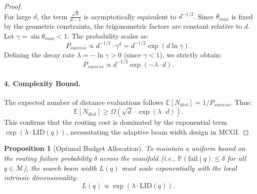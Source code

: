 \documentclass{article}
\theoremstyle{plain}
\newtheorem{proposition}[theorem]{Proposition}
\theoremstyle{definition}
\theoremstyle{remark}
\begin{document}
\begin{proof}
\begin{equation}
\end{equation}
For large $d$, the term $\frac{\sqrt{d}}{d-1}$ is asymptotically equivalent to $d^{-1/2}$. Since $\theta_{max}$ is fixed by the geometric constraints, the trigonometric factors are constant relative to $d$. Let $\gamma = \sin \theta_{max} < 1$. The probability scales as:
\begin{equation}
    P_{success} \propto d^{-1/2} \cdot \gamma^{d} = d^{-1/2} \exp(d \ln \gamma).
\end{equation}
Defining the decay rate $\lambda = -\ln \gamma > 0$ (since $\gamma < 1$), we strictly obtain:
\begin{equation}
    P_{success} \propto d^{-1/2} \exp(-\lambda \cdot d).
\end{equation}

\paragraph{4. Complexity Bound.}
The expected number of distance evaluations follows $\mathbb{E}[N_{dist}] = 1/P_{success}$. Thus:
\begin{equation}
    \mathbb{E}[N_{dist}] \ge \Omega\left( \sqrt{d} \cdot \exp(\lambda \cdot d) \right).
\end{equation}
This confirms that the routing cost is dominated by the exponential term $\exp(\lambda \cdot \text{LID}(q))$, necessitating the adaptive beam width design in MCGI.
\end{proof}

\begin{proposition}[Optimal Budget Allocation]
\label{proof:oba}
To maintain a uniform bound on the routing failure probability $\delta$ across the manifold (i.e., $\mathbb{P}(\text{fail}\;|\;q) \le \delta$ for all $q \in \mathcal{M}$), the search beam width $L(q)$ must scale exponentially with the local intrinsic dimensionality:
\begin{equation}
    L(q) \propto \exp\left( \lambda \cdot \text{LID}(q) \right).
\end{equation}
\end{proposition}
\end{document}

